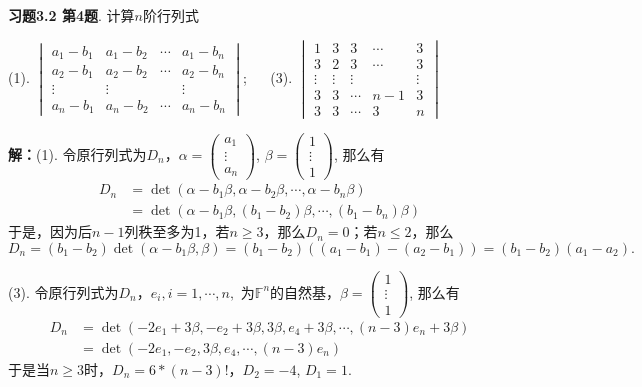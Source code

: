 
\renewcommand{\newpageorvspace}{\vspace{2em}}

\date{2021-10-29  第二次习题课}



\maketitle

{\bf 习题3.2 第4题}. 计算$n$阶行列式

(1). $\begin{vmatrix} a_1-b_1 & a_1-b_2 & \cdots & a_1-b_n \\ a_2-b_1 & a_2-b_2 & \cdots & a_2-b_n \\ \vdots & \vdots & & \vdots \\ a_n-b_1 & a_n-b_2 & \cdots & a_n-b_n \end{vmatrix}$; $\quad$ (3). $\begin{vmatrix} 1 & 3 & 3 & \cdots & 3 \\ 3 & 2 & 3 & \cdots & 3 \\ \vdots & \vdots & \vdots & & \vdots \\ 3 & 3 & \cdots & n-1 & 3 \\ 3 & 3 & \cdots & 3 & n \end{vmatrix}$

{\bf 解：}(1). 令原行列式为$D_n$，$\alpha = \begin{pmatrix} a_1 \\ \vdots \\ a_n \end{pmatrix}$, $\beta = \begin{pmatrix} 1 \\ \vdots \\ 1 \end{pmatrix}$, 那么有
\begin{align*}
D_n & = \det (\alpha-b_1\beta, \alpha-b_2\beta, \cdots, \alpha-b_n\beta) \\
& = \det (\alpha-b_1\beta, (b_1-b_2)\beta, \cdots, (b_1-b_n)\beta)
\end{align*}
于是，因为后$n-1$列秩至多为1，若$n \geqslant 3$，那么$D_n = 0$；若$n \leqslant 2$，那么
$$D_n = (b_1-b_2) \det (\alpha-b_1\beta, \beta) = (b_1-b_2)((a_1-b_1)-(a_2-b_1)) = (b_1-b_2)(a_1-a_2).$$

(3). 令原行列式为$D_n$，$e_i, i=1,\cdots,n,$ 为$\mathbb{F}^n$的自然基，$\beta = \begin{pmatrix} 1 \\ \vdots \\ 1 \end{pmatrix}$, 那么有
\begin{align*}
D_n & = \det (-2e_1+3\beta, -e_2+3\beta, 3\beta, e_4+3\beta, \cdots, (n-3)e_n+3\beta) \\
& = \det (-2e_1, -e_2, 3\beta, e_4, \cdots, (n-3)e_n)
\end{align*}
于是当$n \geqslant 3$时，$D_n = 6*(n-3)!$，$D_2 = -4$, $D_1 = 1$.

